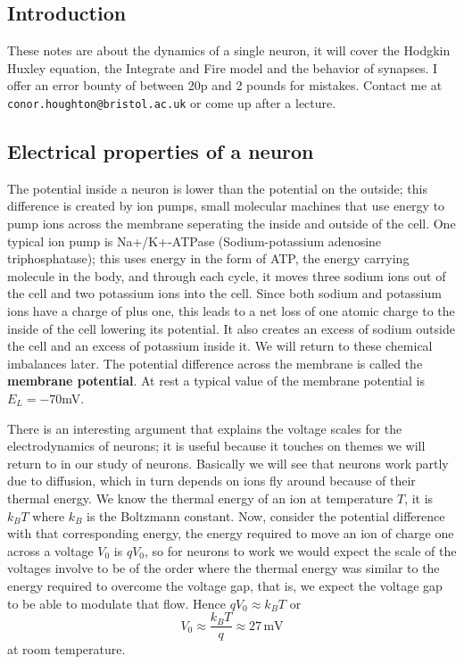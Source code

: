 \documentclass[11pt,a4paper]{scrartcl}
\begin{document}
\subsection*{Introduction}
These notes are about the dynamics of a single neuron, it will cover
the Hodgkin Huxley equation, the Integrate and Fire model and the
behavior of synapses. I offer an error bounty of between 20p and 2
pounds for mistakes. Contact me at
\texttt{conor.houghton@bristol.ac.uk} or come up after a lecture.

\subsection*{Electrical properties of a neuron}
The potential inside a neuron is lower than the potential on the
outside; this difference is created by ion pumps, small molecular
machines that use energy to pump ions across the membrane seperating
the inside and outside of the cell. One typical ion pump is
Na+/K+-ATPase (Sodium-potassium adenosine triphosphatase); this uses
energy in the form of ATP, the energy carrying molecule in the body,
and through each cycle, it moves three sodium ions out of the cell and
two potassium ions into the cell. Since both sodium and potassium ions
have a charge of plus one, this leads to a net loss of one atomic
charge to the inside of the cell lowering its potential. It also
creates an excess of sodium outside the cell and an excess of
potassium inside it. We will return to these chemical imbalances
later. The potential difference across the membrane is called the
\textbf{membrane potential}. At rest a typical value of the membrane
potential is $E_L=-70 $mV.

There is an interesting argument that explains the voltage scales for
the electrodynamics of neurons; it is useful because it touches on
themes we will return to in our study of neurons. Basically we will
see that neurons work partly due to diffusion, which in turn depends
on ions fly around because of their thermal energy. We know the
thermal energy of an ion at temperature $T$, it is $k_BT$ where $k_B$
is the Boltzmann constant. Now, consider the potential difference with
that corresponding energy, the energy required to move an ion of
charge one across a voltage $V_0$ is $qV_0$, so for neurons to work we
would expect the scale of the voltages involve to be of the order
where the thermal energy was similar to the energy required to
overcome the voltage gap, that is, we expect the voltage gap to be able to modulate that flow. Hence $qV_0\approx k_BT$ or
\begin{equation}
V_0\approx \frac{k_BT}{q}\approx 27\,\mbox{mV}
\end{equation}
at room temperature.
\end{document}
